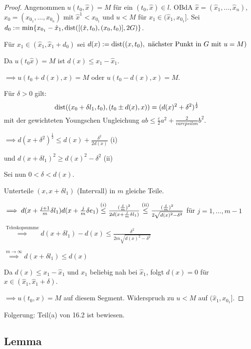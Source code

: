 \begin{proof}
  Angenommen $u(t_0, \hat x) = M$ für ein $(t_0, \hat x) \in l$. OBdA $\hat x = (\hat x_1, \dots, \hat x_n)$, $x_0 = (x_{0_1}, \dots, x_{0_n})$ mit $\hat x^1 < x_{0_1}$ und $u < M$ für $x_1 \in (\hat x_1, x_{0_1}]$.
  Sei $d_0 := \min\{ x_{0_1} - \hat x_1, \operatorname{dist}([(\hat x, t_0), (x_0, t_0)], 2G) \}$.

  Für $x_1 \in (\hat x_1, \hat x_1 + d_0)$ sei $d(x) := \operatorname{dist}((x,t_0), \text{ nächster Punkt in $G$ mit $u = M$})$

  Da $u(t_0 \hat x) = M$ ist $d(x) \leq x_1 - \hat x_1$.

  $\implies u(t_0 + d(x), x) = M$ oder $u(t_0 - d(x), x) = M$.

  Für $\delta > 0$ gilt:
  $$
  \operatorname{dist}((x_0 + \delta l_1, t_0), (t_0 \pm d(x), x)) = (d(x)^2 + \delta^2)^{\frac{1}{2}}
  $$
  mit der gewichteten Youngschen Ungleichung $a b \leq \frac{\varepsilon}{2} a^2 + \frac{2}{varepsilon} b^2$.

  $\implies d(x + \delta^2)^{\frac{1}{2}} \leq d(x) + \frac{\delta^2}{2d(x)}$ (i)

  und $d(x + \delta l_1)^2 \geq d(x)^2 - \delta^2 $ (ii)

  Sei nun $0 < \delta < d(x)$.

  Unterteile $(x, x + \delta l_1)$ (Intervall) in $m$ gleiche Teile.
  
  $\implies d(x + \frac{j + 1}{m} \delta l_1)  d(x + \frac{j}{m} \delta e_1) \overset{\text(i)}{\leq} \frac{(\frac{\delta}{m})^2}{2d(x + \frac{j}{m} \delta l_1)} \overset{\text{(ii)}}{\leq} \frac{(\frac{\delta}{m})^2}{2 \sqrt{d(x)^2 - \delta^2}}$ für $j = 1, \dots, m-1$

  $\overset{\text{Teleskopsumme}}{\implies} d(x + \delta l_1) - d(x) \leq \frac{\delta^2}{2m \sqrt{d(x)^2 - \delta^2}}$

  $\overset{m \to \infty}{\implies} d(x + \delta l_1) \leq d(x)$

  Da $d(x) \leq x_1 - \hat x_1$ und $x_1$ beliebig nah bei $\hat x_1$, folgt $d(x) = 0$ für $x \in (\hat x_1, \hat x_1 + \delta)$.

  $\implies u(t_0, x) = M$ auf diesem Segment. Widerspruch zu $u < M$ auf $(\hat x_1, x_{0_1}]$.
\end{proof}

Folgerung: Teil(a) von 16.2 ist bewiesen.

\subsection{Lemma}

